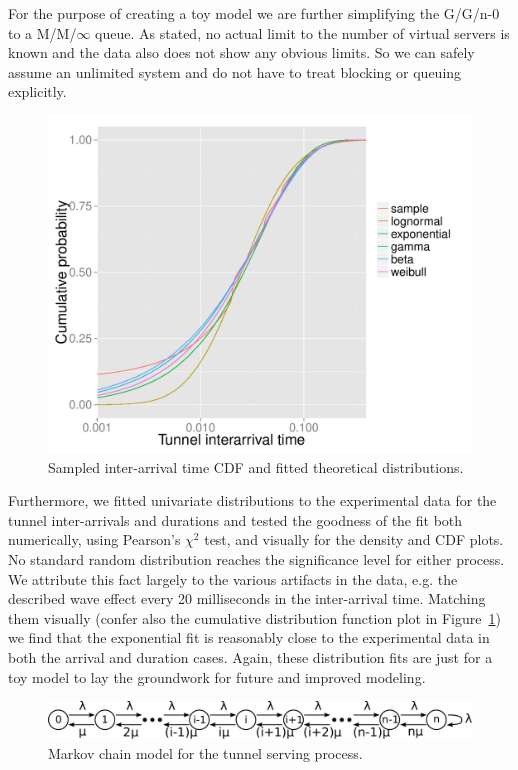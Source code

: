 For the purpose of creating a toy model we are further simplifying the G/G/n-0 to a M/M/$\infty$ queue. As stated, no actual limit to the number of virtual servers is known and the data also does not show any obvious limits. So we can safely assume an unlimited system and do not have to treat blocking or queuing explicitly.

\begin{figure}[htb]
	\centering
	\includegraphics[width=\columnwidth]{images/R-IAT-ecdfs.pdf}
	\caption{Sampled inter-arrival time CDF and fitted theoretical distributions.}
	\label{c4:fig:IAT-cdfs}
\end{figure}

Furthermore, we fitted univariate distributions to the experimental data for the tunnel inter-arrivals and durations and tested the goodness of the fit both numerically, using Pearson's $\chi^2$ test, and visually for the density and CDF plots. No standard random distribution reaches the significance level for either process. We attribute this fact largely to the various artifacts in the data, e.g. the described wave effect every 20 milliseconds in the inter-arrival time. Matching them visually (confer also the cumulative distribution function plot in Figure~\ref{c4:fig:IAT-cdfs}) we find that the exponential fit is reasonably close to the experimental data in both the arrival and duration cases. Again, these distribution fits are just for a toy model to lay the groundwork for future and improved modeling.


\begin{figure}[htb]
	\centering
	\includegraphics[width=\columnwidth]{images/markovchain.pdf}
	\caption{Markov chain model for the tunnel serving process.}
	\label{c4:fig:markovchain}
\end{figure}

